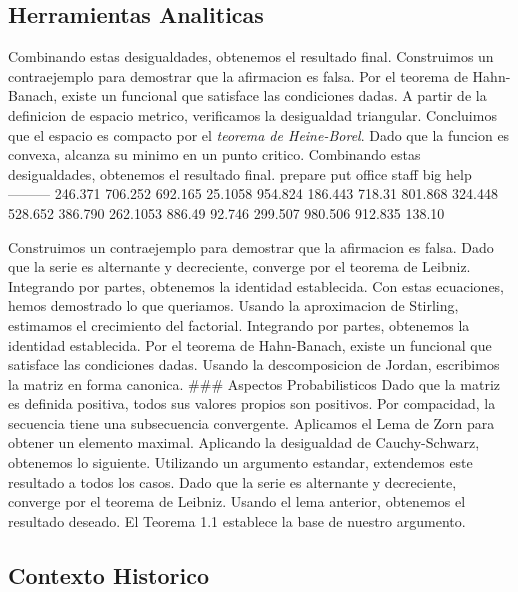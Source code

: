 \documentclass[
]{article}
\begin{document}
\subsection{Herramientas Analiticas}\label{herramientas-analiticas}

Combinando estas desigualdades, obtenemos el resultado final.
Construimos un contraejemplo para demostrar que la afirmacion es falsa.
Por el teorema de Hahn-Banach, existe un funcional que satisface las
condiciones dadas. A partir de la definicion de espacio metrico,
verificamos la desigualdad triangular. Concluimos que el espacio es
compacto por el \emph{teorema de Heine-Borel}. Dado que la funcion es
convexa, alcanza su minimo en un punto critico. Combinando estas
desigualdades, obtenemos el resultado final. \textbar{} prepare
\textbar{} put \textbar{} office \textbar{} staff \textbar{} big
\textbar{} help \textbar{}
\textbar--\textbar--\textbar--\textbar--\textbar--\textbar--\textbar{}
\textbar{} 246.371 \textbar{} 706.252 \textbar{} 692.165 \textbar{}
25.1058 \textbar{} 954.824 \textbar{} 186.443 \textbar{} \textbar{}
718.31 \textbar{} 801.868 \textbar{} 324.448 \textbar{} 528.652
\textbar{} 386.790 \textbar{} 262.1053 \textbar{} \textbar{} 886.49
\textbar{} 92.746 \textbar{} 299.507 \textbar{} 980.506 \textbar{}
912.835 \textbar{} 138.10 \textbar{}

Construimos un contraejemplo para demostrar que la afirmacion es falsa.
Dado que la serie es alternante y decreciente, converge por el teorema
de Leibniz. Integrando por partes, obtenemos la identidad establecida.
Con estas ecuaciones, hemos demostrado lo que queriamos. \omega Usando
la aproximacion de Stirling, estimamos el crecimiento del factorial.
Integrando por partes, obtenemos la identidad establecida. Por el
teorema de Hahn-Banach, existe un funcional que satisface las
condiciones dadas. Usando la descomposicion de Jordan, escribimos la
matriz en forma canonica. \#\#\# Aspectos Probabilisticos Dado que la
matriz es definida positiva, todos sus valores propios son positivos.
Por compacidad, la secuencia tiene una subsecuencia convergente.
Aplicamos el Lema de Zorn para obtener un elemento maximal. Aplicando la
desigualdad de Cauchy-Schwarz, obtenemos lo siguiente. Utilizando un
argumento estandar, extendemos este resultado a todos los casos. Dado
que la serie es alternante y decreciente, converge por el teorema de
Leibniz. Usando el lema anterior, obtenemos el resultado deseado. El
Teorema 1.1 establece la base de nuestro argumento.

\subsection{Contexto Historico}\label{contexto-historico}
\end{document}

